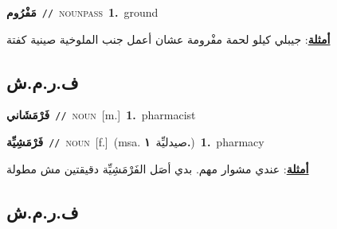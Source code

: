 \documentclass[10pt,a4paper,twoside]{article} %
\begin{document}
\begin{multicols}{2}
{\setlength\topsep{0pt}\textbf{\foreignlanguage{arabic}{مَفْرُوم}}\ {\color{gray}\texttt{//}\color{black}}\ \textsc{noun\textunderscore pass}\ \textbf{1.}~ground\  \begin{flushright}\color{gray}\foreignlanguage{arabic}{\textbf{\underline{\foreignlanguage{arabic}{أمثلة}}}: جيبلي كيلو لحمة مفْرومة عشان أعمل جنب الملوخية صينية كفتة}\end{flushright}\color{black}} \vspace{2mm}

\vspace{-3mm}
\subsection*{\color{blue}\foreignlanguage{arabic}{ف.ر.م.ش}\color{blue}{}} 

{\setlength\topsep{0pt}\textbf{\foreignlanguage{arabic}{فَرْمَشَاني}}\ {\color{gray}\texttt{//}\color{black}}\ \textsc{noun}\ [m.]\ \textbf{1.}~pharmacist\ } \vspace{2mm}

{\setlength\topsep{0pt}\textbf{\foreignlanguage{arabic}{فَرْمَشِيِّة}}\ {\color{gray}\texttt{//}\color{black}}\ \textsc{noun}\ [f.]\ \color{gray}(msa. \foreignlanguage{arabic}{صيدليِّة}~\foreignlanguage{arabic}{\textbf{١.}})\color{black}\ \textbf{1.}~pharmacy\  \begin{flushright}\color{gray}\foreignlanguage{arabic}{\textbf{\underline{\foreignlanguage{arabic}{أمثلة}}}: عندي مشوار مهم. بدي أصَل الفَرْمَشِيِّة دقيقتين مش مطولة}\end{flushright}\color{black}} \vspace{2mm}

\vspace{-3mm}
\subsection*{\color{blue}\foreignlanguage{arabic}{ف.ر.م.ش}\color{blue}{ (ntws)}} 


\end{multicols}
\end{document}
